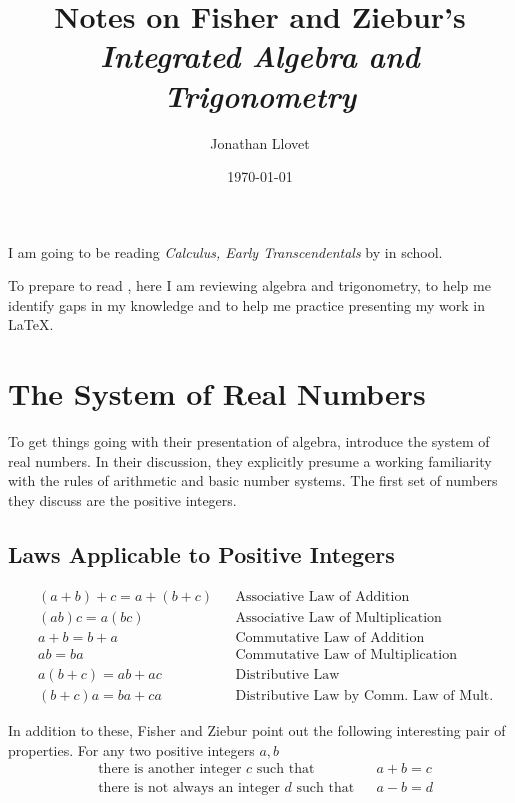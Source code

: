 \documentclass[leqno]{article}
\title{Notes on Fisher and Ziebur's\\\textit{Integrated Algebra and Trigonometry}}
\author{Jonathan Llovet}
\date{\today}
\begin{document}
\maketitle

I am going to be reading \textit{Calculus, Early Transcendentals} by \textcite{briggsCalculusEarlyTranscendentals2019} in school.

To prepare to read \textcite{briggsCalculusEarlyTranscendentals2019},
here I am reviewing algebra and trigonometry,
to help me identify gaps in my knowledge and
to help me practice presenting my work in \LaTeX.

\newpage
\section{The System of Real Numbers}

To get things going with their presentation of algebra,
\textcite{fisherIntegratedAlgebraTrigonometry1962}
introduce the system of real numbers.
In their discussion, they explicitly presume a working familiarity
with the rules of arithmetic and basic number systems.
The first set of numbers they discuss are the positive integers.

\subsection{Laws Applicable to Positive Integers}

\begin{align}
    &(a+b)+c = a+(b+c) &&\text{Associative Law of Addition}\\
    &(ab)c = a(bc) &&\text{Associative Law of Multiplication}\\
    &a+b = b+a &&\text{Commutative Law of Addition}\\
    &ab = ba &&\text{Commutative Law of Multiplication}\\
    &a(b+c) = ab+ac &&\text{Distributive Law}\\
    &(b+c)a = ba+ca &&\text{Distributive Law by Comm. Law of Mult.}
\end{align}

In addition to these, Fisher and Ziebur point out the following interesting pair of properties.
For any two positive integers \(a, b \)
\begin{align}
    &\text{there is another integer \(c\) such that} &&a+b = c\\
    &\text{there is not always an integer \(d\) such that} &&a-b = d
\end{align}
\end{document}
